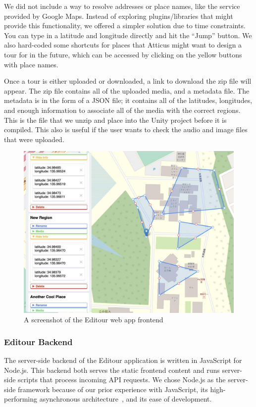 \documentclass[a4paper, 10pt, american, titlepage]{article}
\begin{document}
We did not include a way to resolve addresses or place names, like the service
provided by Google Maps. Instead of exploring plugins/libraries that might
provide this functionality, we offered a simpler solution due to time
constraints.  You can type in a latitude and longitude directly and hit the
``Jump'' button. We also hard-coded some shortcuts for places that Atticus
might want to design a tour for in the future, which can be accessed by
clicking on the yellow buttons with place names.

Once a tour is either uploaded or downloaded, a link to download the zip file
will appear. The zip file contains all of the uploaded media, and a metadata
file. The metadata is in the form of a JSON file; it contains all of the
latitudes, longitudes, and enough information to associate all of the media
with the correct regions. This is the file that we unzip and place into the
Unity project before it is compiled. This also is useful if the user wants to
check the audio and image files that were uploaded.

\begin{figure}[h]
	\centering
	\includegraphics[width=\textwidth]{editour.jpg}
	\caption{A screenshot of the Editour web app frontend}
	\label{fig:editour}
\end{figure}

\subsubsection{Editour Backend}
\label{sec:editourBackend}

The server-side backend of the Editour application is written in JavaScript for
Node.js. This backend both serves the static frontend content and runs
server-side scripts that process incoming API requests.  We chose Node.js as the
server-side framework because of our prior experience with JavaScript, its
high-performing asynchronous architecture~\autocite{orsini2013}, and its ease of
development.
\end{document}
